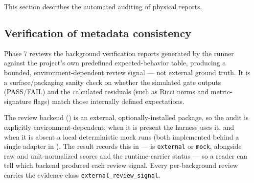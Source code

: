 
This section describes the automated auditing of physical reports.

\subsection{Verification of metadata consistency}
Phase 7 reviews the background verification reports generated by the runner against the project's own predefined expected-behavior table, producing a bounded, environment-dependent review signal --- not external ground truth. It is a surface/packaging sanity check on whether the simulated gate outputs (PASS/FAIL) and the calculated residuals (such as Ricci norms and metric-signature flags) match those internally defined expectations.

The review backend () is an external, optionally-installed package, so the audit is explicitly environment-dependent: when it is present the harness uses it, and when it is absent a local deterministic mock runs (both implemented behind a single adapter in ). The result records this in  ---  is \texttt{external} or \texttt{mock}, alongside raw and unit-normalized scores and the runtime-carrier status --- so a reader can tell which backend produced each review signal. Every per-background review carries the evidence class \texttt{external\_review\_signal}.

